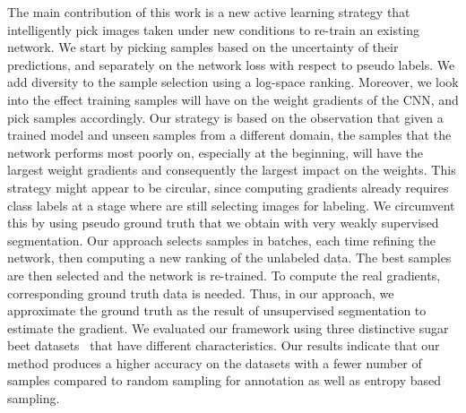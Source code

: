 \documentclass[letterpaper, 10 pt, conference]{ieeeconf}  %
\begin{document}
The main contribution of this work is a new active learning strategy that
intelligently pick images taken under new conditions to re-train an existing network.
We start by picking samples based 
on the uncertainty of their predictions, and separately on the network loss with respect 
to pseudo labels. We add diversity to the sample selection using a log-space ranking.
Moreover, we look into the effect training samples will have on the weight gradients of the CNN,
and pick samples accordingly.
Our strategy is based  on the observation that given a trained model and unseen
samples from  a different domain, the samples that the network performs most
poorly on, especially at the  beginning, will have the largest weight
gradients and consequently the largest impact on the  weights. This strategy might appear to be circular, since computing gradients already requires class labels at a stage where are still selecting images for labeling.  We circumvent this by using pseudo ground truth that we obtain with very weakly supervised segmentation. Our approach
selects samples in batches, each time refining the network, then computing a
new  ranking of the unlabeled data. The best samples are then selected and the
network is re-trained. To compute the real gradients, corresponding ground
truth data is needed. Thus, in our approach, we approximate the ground truth as the result of unsupervised segmentation to estimate the gradient.  We
evaluated our framework using three distinctive sugar beet datasets~\cite{chebrolu2017agricultural} that have different characteristics.  Our results indicate that our method produces a
higher accuracy on the datasets with a fewer  number of samples compared to
random sampling for annotation as well as entropy based sampling.


 
   


   

\end{document}
